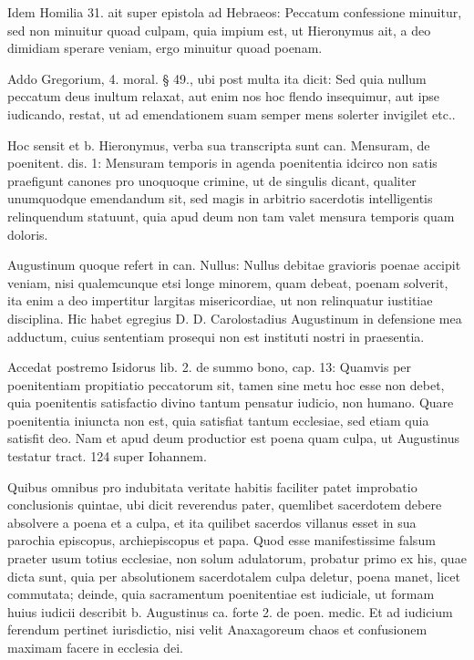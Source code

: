 Idem Homilia 31. ait super epistola ad Hebraeos: Peccatum confessione minuitur, sed non minuitur quoad culpam, quia impium est, ut Hieronymus ait, a deo dimidiam sperare veniam, ergo minuitur quoad poenam.

\marginpar{\small[375]} Addo Gregorium, 4. moral. § 49., ubi post multa ita dicit: Sed quia nullum peccatum deus inultum relaxat, aut enim nos hoc flendo insequimur, aut ipse iudicando, restat, ut ad emendationem suam semper mens solerter invigilet etc..

Hoc sensit et b. Hieronymus, verba sua transcripta sunt can. Mensuram, de poenitent. dis. 1: Mensuram temporis in agenda poenitentia idcirco non satis praefigunt canones pro unoquoque crimine, ut de singulis dicant, qualiter unumquodque emendandum sit, sed magis in arbitrio sacerdotis intelligentis relinquendum statuunt, quia apud deum non tam valet mensura temporis quam doloris.

Augustinum quoque refert in can. Nullus: Nullus debitae gravioris poenae accipit veniam, nisi qualemcunque etsi longe minorem, quam debeat, poenam solverit, ita enim a deo impertitur largitas misericordiae, ut non relinquatur iustitiae disciplina. Hic habet egregius D. D. Carolostadius Augustinum in defensione mea adductum, cuius sententiam prosequi non est instituti nostri in praesentia.

Accedat postremo Isidorus lib. 2. de summo bono, cap. 13: Quamvis per poenitentiam propitiatio peccatorum sit, tamen sine metu hoc esse non debet, quia poenitentis satisfactio divino tantum pensatur iudicio, non humano. Quare poenitentia iniuncta non est, quia satisfiat tantum ecclesiae, sed etiam quia satisfit deo. Nam et apud deum productior est poena quam culpa, ut Augustinus testatur tract. 124 super Iohannem.

Quibus omnibus pro indubitata veritate habitis faciliter patet improbatio conclusionis quintae, ubi dicit reverendus pater, quemlibet sacerdotem debere absolvere a poena et a culpa, et ita quilibet sacerdos villanus esset in sua parochia episcopus, archiepiscopus et papa. Quod esse manifestissime falsum praeter usum totius ecclesiae, non solum adulatorum, probatur primo ex his, quae dicta sunt, quia per absolutionem sacerdotalem culpa deletur, poena manet, licet commutata; deinde, quia sacramentum poenitentiae est iudiciale, ut formam huius iudicii describit b. Augustinus ca. forte 2. de poen. medic. Et ad iudicium ferendum pertinet iurisdictio, nisi velit Anaxagoreum chaos et confusionem maximam facere in ecclesia dei.

